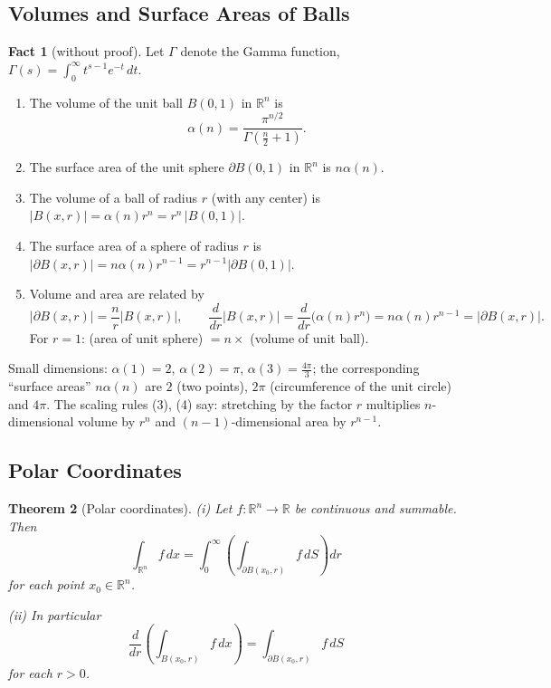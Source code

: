 \documentclass[11pt]{article}
\theoremstyle{plain}
\newtheorem{theorem}{Theorem}[section]
\theoremstyle{definition}
\newtheorem{fact}[theorem]{Fact}
\theoremstyle{remark}
\begin{document}
\subsection{Volumes and Surface Areas of Balls}\label{ssec:volumes}

\begin{fact}[without proof]\label{fact:balls}
Let $\Gamma$ denote the Gamma function, $\Gamma(s) = \int_0^\infty t^{s-1} e^{-t}\, dt$.
\begin{enumerate}
    \item The volume of the unit ball $B(0,1)$ in $\mathbb{R}^n$ is
    $$ \alpha(n) = \frac{\pi^{n/2}}{\Gamma(\frac{n}{2} + 1)}. $$
    \item The surface area of the unit sphere $\partial B(0,1)$ in $\mathbb{R}^n$ is $n\alpha(n)$.
    \item The volume of a ball of radius $r$ (with any center) is $|B(x,r)| = \alpha(n) r^n = r^n\, |B(0,1)|$.
    \item The surface area of a sphere of radius $r$ is $|\partial B(x,r)| = n\alpha(n) r^{n-1} = r^{n-1} |\partial B(0,1)|$.
    \item Volume and area are related by
    $$ |\partial B(x,r)| = \frac{n}{r} |B(x,r)|, \qquad \frac{d}{dr}|B(x,r)| = \frac{d}{dr}\big(\alpha(n) r^n\big) = n\alpha(n) r^{n-1} = |\partial B(x,r)|. $$
    For $r = 1$: (area of unit sphere) $= n \times$ (volume of unit ball).
\end{enumerate}
Small dimensions: $\alpha(1) = 2$, $\alpha(2) = \pi$, $\alpha(3) = \frac{4\pi}{3}$; the corresponding ``surface areas'' $n\alpha(n)$ are $2$ (two points), $2\pi$ (circumference of the unit circle) and $4\pi$. The scaling rules (3), (4) say: stretching by the factor $r$ multiplies $n$-dimensional volume by $r^n$ and $(n-1)$-dimensional area by $r^{n-1}$.
\end{fact}

\subsection{Polar Coordinates}\label{ssec:polar}

\begin{theorem}[Polar coordinates]\label{thm:polar}
(i) Let $f : \mathbb{R}^n \to \mathbb{R}$ be continuous and summable. Then
$$ \int_{\mathbb{R}^n} f\, dx = \int_0^\infty \left( \int_{\partial B(x_0,r)} f\, dS \right) dr $$
for each point $x_0 \in \mathbb{R}^n$.

(ii) In particular
$$ \frac{d}{dr}\left( \int_{B(x_0,r)} f\, dx \right) = \int_{\partial B(x_0,r)} f\, dS $$
for each $r > 0$.
\end{theorem}
\end{document}
